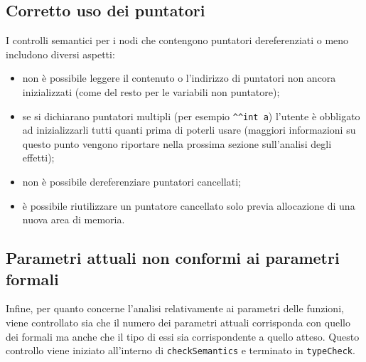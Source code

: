 \documentclass[../report.tex]{subfiles}
\begin{document}
\subsection{Corretto uso dei puntatori}\label{s:corretto-usi-puntatori}
I controlli semantici per i nodi che contengono puntatori dereferenziati o meno includono diversi aspetti:
\begin{itemize}
    \item non è possibile leggere il contenuto o l'indirizzo di puntatori non ancora inizializzati (come del resto per le variabili non puntatore);
    \item se si dichiarano puntatori multipli (per esempio \verb|^^int a|) l'utente è obbligato ad inizializzarli tutti quanti prima di poterli usare (maggiori informazioni su questo punto vengono riportare nella prossima sezione sull'analisi degli effetti);
    \item non è possibile dereferenziare puntatori cancellati;
    \item è possibile riutilizzare un puntatore cancellato solo previa allocazione di una nuova area di memoria.
\end{itemize}

\subsection{Parametri attuali non conformi ai parametri formali}\label{s:parametri-attuali-non-conformi-parametri-formali}
Infine, per quanto concerne l'analisi relativamente ai parametri delle funzioni, viene controllato sia che il numero dei parametri attuali corrisponda con quello dei formali ma anche che il tipo di essi sia corrispondente a quello atteso.
Questo controllo viene iniziato all'interno di \verb|checkSemantics| e terminato in \verb|typeCheck|.
\end{document}
